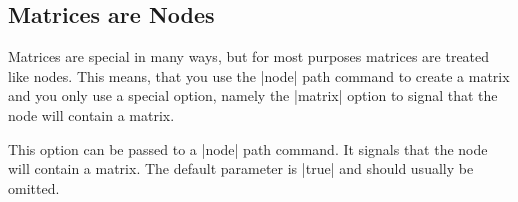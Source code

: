 \subsection{Matrices are Nodes}

Matrices are special in many ways, but for most purposes matrices are
treated like nodes. This means, that you use the |node| path command
to create a matrix and you only use a special option, namely the
|matrix| option to signal that the node will contain a matrix.

\begin{itemize}
   This option can be
  passed to a |node| path command. It signals that the node will contain
  a matrix. The default parameter is |true| and should usually be
  omitted.
\begin{codeexample}[]
\end{codeexample}
\end{itemize}


